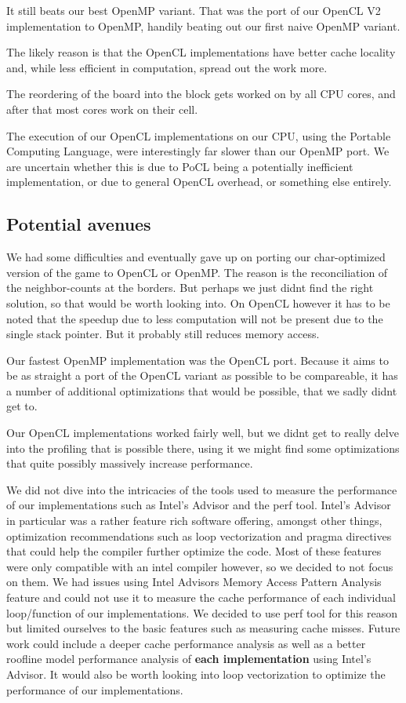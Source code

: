 \documentclass[a4paper,english,12pt,twoside=false]{scrartcl} %
\begin{document}
It still beats our best OpenMP variant. That was the port of our OpenCL V2 implementation to OpenMP, handily beating out our first naive OpenMP variant.

The likely reason is that the OpenCL implementations have better cache locality and, while less efficient in computation, spread out the work more.

The reordering of the board into the block gets worked on by all CPU cores, and after that most cores work on their cell.

The execution of our OpenCL implementations on our CPU, using the Portable Computing Language, were interestingly far slower than our OpenMP port.
We are uncertain whether this is due to PoCL being a potentially inefficient implementation, or due to general OpenCL overhead, or something else entirely.

\subsection{Potential avenues}

We had some difficulties and eventually gave up on porting our char-optimized version of the game to OpenCL or OpenMP. 
The reason is the reconciliation of the neighbor-counts at the borders.
But perhaps we just didnt find the right solution, so that would be worth looking into.
On OpenCL however it has to be noted that the speedup due to less computation will not be present due to the single stack pointer. 
But it probably still reduces memory access.

Our fastest OpenMP implementation was the OpenCL port.
Because it aims to be as straight a port of the OpenCL variant as possible to be compareable, 
it has a number of additional optimizations that would be possible, that we sadly didnt get to.

Our OpenCL implementations worked fairly well, but we didnt get to really delve into the profiling that is possible there, 
using it we might find some optimizations that quite possibly massively increase performance.

We did not dive into the intricacies of the tools used to measure the performance of our implementations such as
Intel's Advisor and the perf tool. Intel's Advisor in particular was a rather feature rich software offering, amongst other things,
optimization recommendations such as loop vectorization and pragma directives that could help the compiler further
optimize the code. Most of these features were only compatible with an intel compiler however, so we decided to not focus on them.
We had issues using Intel Advisors Memory Access Pattern Analysis feature and could not use it
to measure the cache performance of each individual loop/function of our implementations. We decided to use perf tool for this reason
but limited ourselves to the basic features such as measuring cache misses. Future work could include a deeper cache performance analysis
as well as a better roofline model performance analysis of \textbf{each implementation} using Intel's Advisor. It would also be worth looking
into loop vectorization to optimize the performance of our implementations. \breakln
\end{document}
